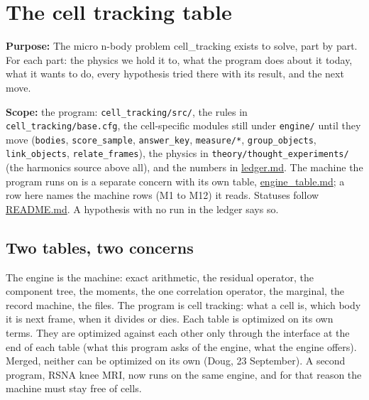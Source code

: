 \chapter{\texorpdfstring{The cell tracking table}{The cell tracking table}}
\label{chap:cell-tracking-table}

\textbf{Purpose:} The micro n-body problem cell\_\allowbreak{}tracking exists to solve, part by part. For each part: the physics we hold it to, what the program does about it today, what it wants to do, every hypothesis tried there with its result, and the next move.

\textbf{Scope:} the program: \texttt{cell\_\allowbreak{}tracking/\allowbreak{}src/\allowbreak{}}, the rules in \texttt{cell\_\allowbreak{}tracking/\allowbreak{}base.\allowbreak{}cfg}, the cell-specific modules still under \texttt{engine/\allowbreak{}} until they move (\texttt{bodies}, \texttt{score\_\allowbreak{}sample}, \texttt{answer\_\allowbreak{}key}, \texttt{measure/\allowbreak{}*}, \texttt{group\_\allowbreak{}objects}, \texttt{link\_\allowbreak{}objects}, \texttt{relate\_\allowbreak{}frames}), the physics in \texttt{theory/\allowbreak{}thought\_\allowbreak{}experiments/\allowbreak{}} (the harmonics source above all), and the numbers in \hyperref[chap:ledger]{ledger.md}. The machine the program runs on is a separate concern with its own table, \hyperref[chap:engine-table]{engine\_\allowbreak{}table.md}; a row here names the machine rows (M1 to M12) it reads. Statuses follow \hyperref[chap:readme]{README.md}. A hypothesis with no run in the ledger says so.

\section{\texorpdfstring{Two tables, two concerns}{Two tables, two concerns}}

The engine is the machine: exact arithmetic, the residual operator, the component tree, the moments, the one correlation operator, the marginal, the record machine, the files. The program is cell tracking: what a cell is, which body it is next frame, when it divides or dies. Each table is optimized on its own terms. They are optimized against each other only through the interface at the end of each table (what this program asks of the engine, what the engine offers). Merged, neither can be optimized on its own (Doug, 23 September). A second program, RSNA knee MRI, now runs on the same engine, and for that reason the machine must stay free of cells.

